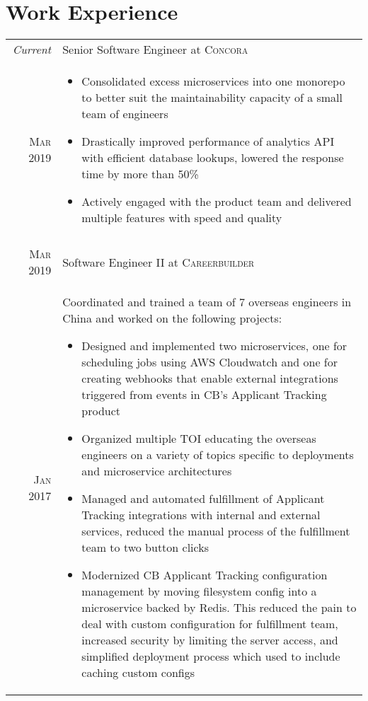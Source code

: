\documentclass[a4paper,10pt]{article}
\begin{document}
\section{Work Experience}
\begin{tabular}{r|p{13cm}}
 \emph{Current} & Senior Software Engineer at \textsc{Concora} \\
 \textsc{Mar 2019} &
 \begin{itemize}
  \item \footnotesize{Consolidated excess microservices into one monorepo to better suit the maintainability capacity of a small team of engineers}
  \item \footnotesize{Drastically improved performance of analytics API with efficient database lookups, lowered the response time by more than 50\%}
  \item \footnotesize{Actively engaged with the product team and delivered multiple features with speed and quality }
 \end{itemize}
 \\
 \multicolumn{2}{c}{} \\ 
 \textsc{Mar 2019} & Software Engineer II at \textsc{Careerbuilder} \\
 \textsc{Jan 2017} &
 \footnotesize{Coordinated and trained a team of 7 overseas engineers in China and worked on the following projects:} 
 \begin{itemize}
  \item \footnotesize{Designed and implemented two microservices, one for scheduling jobs using AWS Cloudwatch and one for creating webhooks that enable external integrations triggered from events in CB's Applicant Tracking product }
  \item \footnotesize{Organized multiple TOI educating the overseas engineers on a variety of topics specific to deployments and microservice architectures}
  \item \footnotesize{Managed and automated fulfillment of Applicant Tracking integrations with internal and external services, reduced the manual process of the fulfillment team to two button clicks}
  \item \footnotesize{Modernized CB Applicant Tracking configuration management by moving filesystem config into a microservice backed by Redis. This reduced the pain to deal with custom configuration for fulfillment team, increased security by limiting the server access, and simplified deployment process which used to include caching custom configs}
 \end{itemize}

\end{tabular}
\end{document}
